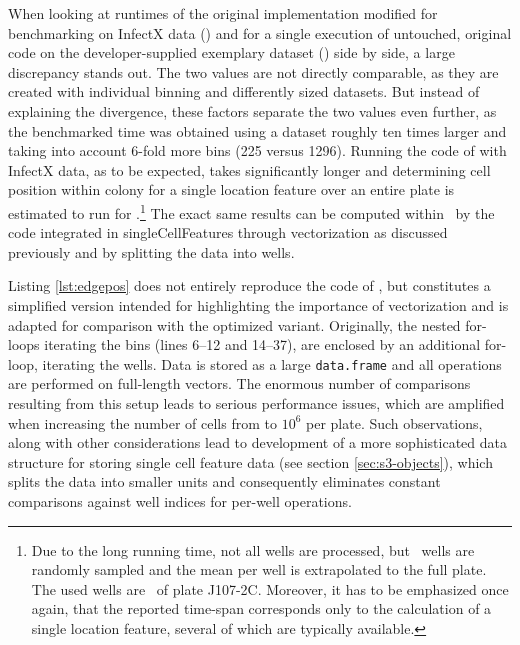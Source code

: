 
When looking at runtimes of the original implementation modified for benchmarking on InfectX data (\knitrScfBenchmarkEdgeTotal) and for a single execution of untouched, original code on the developer-supplied exemplary dataset (\knitrScfRnaicellEdgepos) side by side, a large discrepancy stands out. The two values are not directly comparable, as they are created with individual binning and differently sized datasets. But instead of explaining the divergence, these factors separate the two values even further, as the benchmarked time was obtained using a dataset roughly ten times larger and taking into account 6-fold more bins (225 versus 1296). Running the code of \citeauthor{Knapp2011} with InfectX data, as to be expected, takes significantly longer and determining cell position within colony for a single location feature over an entire plate is estimated to run for \knitrScfFullPlateRnaicellTime.\footnote{Due to the long running time, not all wells are processed, but \knitrScfFullPlateNSamp\ wells are randomly sampled and the mean per well is extrapolated to the full plate. The used wells are \knitrScfFullPlateSampWell\ of plate J107-2C. Moreover, it has to be emphasized once again, that the reported time-span corresponds only to the calculation of a single location feature, several of which are typically available.} The exact same results can be computed within \knitrScfFullPlateMyTime\ by the code integrated in singleCellFeatures through vectorization as discussed previously and by splitting the data into wells.

Listing \ref{lst:edgepos} does not entirely reproduce the code of \citeauthor{Knapp2011}, but constitutes a simplified version intended for highlighting the importance of vectorization and is adapted for comparison with the optimized variant. Originally, the nested for-loops iterating the bins (lines 6--12 and 14--37), are enclosed by an additional for-loop, iterating the wells. Data is stored as a large \texttt{data.frame} and all operations are performed on full-length vectors. The enormous number of comparisons resulting from this setup leads to serious performance issues, which are amplified when increasing the number of cells from  to \tilde $10^6$ per plate. Such observations, along with other considerations lead to development of a more sophisticated data structure for storing single cell feature data (see section \ref{sec:s3-objects}), which splits the data into smaller units and consequently eliminates constant comparisons against well indices for per-well operations.

